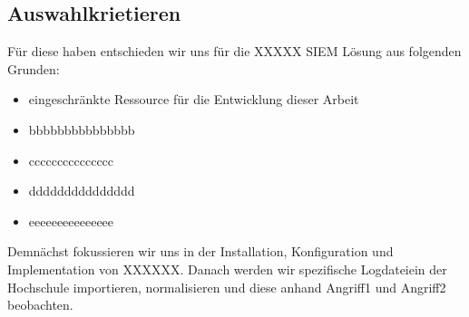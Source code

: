 \subsection{Auswahlkrietieren}
Für diese haben entschieden wir uns für die XXXXX \gls{SIEM} Lösung aus folgenden Grunden:

\begin{itemize}[noitemsep]
   \item eingeschränkte Ressource für die Entwicklung dieser Arbeit
   \item bbbbbbbbbbbbbbb
   \item ccccccccccccccc
   \item ddddddddddddddd
   \item eeeeeeeeeeeeeee
\end{itemize}

Demnächst fokussieren wir uns in der Installation, Konfiguration und Implementation von XXXXXX. Danach werden wir spezifische Logdateiein der Hochschule importieren, normalisieren und diese anhand Angriff1 und Angriff2 beobachten.